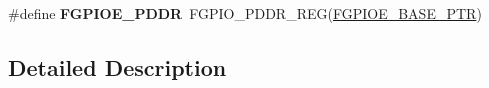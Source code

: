 \begin{DoxyCompactItemize}
\item 
\mbox{\label{group___f_g_p_i_o___register___accessor___macros_ga808099029ad996db9abe97d36a1c7b9d}} 
\#define {\bfseries F\+G\+P\+I\+O\+E\+\_\+\+P\+D\+DR}~F\+G\+P\+I\+O\+\_\+\+P\+D\+D\+R\+\_\+\+R\+EG(\hyperlink{group___f_g_p_i_o___peripheral_ga07d1ba914f3ded63431edec77d4544ee}{F\+G\+P\+I\+O\+E\+\_\+\+B\+A\+S\+E\+\_\+\+P\+TR})
\end{DoxyCompactItemize}


\subsection{Detailed Description}
